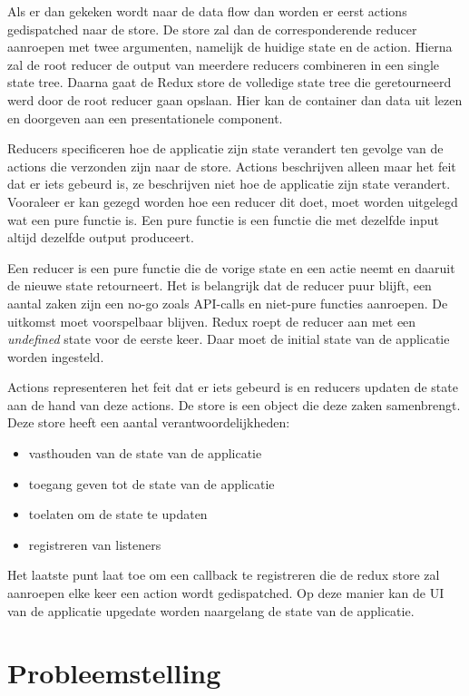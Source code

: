 Als er dan gekeken wordt naar de data flow dan worden er eerst actions gedispatched naar de store. De store zal dan de corresponderende reducer aanroepen met twee argumenten, namelijk de huidige state en de action. Hierna zal de root reducer de output van meerdere reducers combineren in een single state tree. Daarna gaat de Redux store de volledige state tree die geretourneerd werd door de root reducer gaan opslaan. Hier kan de container dan data uit lezen en doorgeven aan een presentationele component.

Reducers specificeren hoe de applicatie zijn state verandert ten gevolge van de actions die verzonden zijn naar de store. Actions beschrijven alleen maar het feit dat er iets gebeurd is, ze beschrijven niet hoe de applicatie zijn state verandert.
Vooraleer er kan gezegd worden hoe een reducer dit doet, moet worden uitgelegd wat een pure functie is. Een pure functie is een functie die met dezelfde input altijd dezelfde output produceert. \autocite{Pure01}

Een reducer is een pure functie die de vorige state en een actie neemt en daaruit de nieuwe state retourneert. Het is belangrijk dat de reducer puur blijft, een aantal zaken zijn een no-go zoals API-calls en niet-pure functies aanroepen. De uitkomst moet voorspelbaar blijven. Redux roept de reducer aan met een \textit{undefined} state voor de eerste keer. Daar moet de initial state van de applicatie worden ingesteld. \autocite{Redux02}

Actions representeren het feit dat er iets gebeurd is en reducers updaten de state aan de hand van deze actions. De store is een object die deze zaken samenbrengt. Deze store heeft een aantal verantwoordelijkheden: 
\begin{itemize}
	\item vasthouden van de state van de applicatie
	\item toegang geven tot de state van de applicatie
	\item toelaten om de state te updaten
	\item registreren van listeners
\end{itemize}
Het laatste punt laat toe om een callback te registreren die de redux store zal aanroepen elke keer een action wordt gedispatched. Op deze manier kan de UI van de applicatie upgedate worden naargelang de state van de applicatie. 



\section{Probleemstelling}
\label{sec:probleemstelling}

